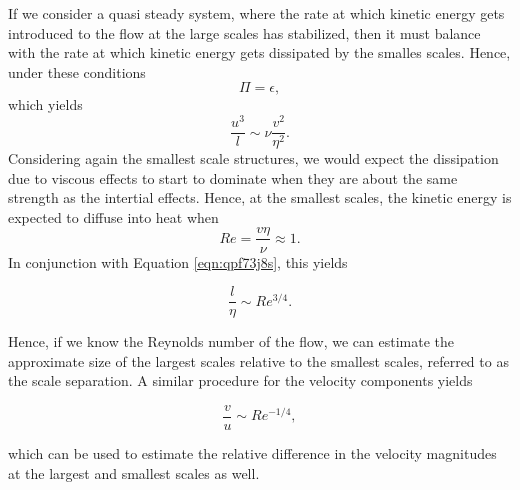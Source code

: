 If we consider a quasi steady system, where the rate at which kinetic energy gets introduced to the flow at the large scales has stabilized, then it must balance with the rate at which kinetic energy gets dissipated by the smalles scales. Hence, under these conditions
\begin{equation}
	\Pi = \epsilon,
\end{equation}
which yields
\begin{equation}
	\label{eqn:qpf73j8s}
	\frac{u^3}{l} \sim \nu \frac{v^2}{\eta^2}.
\end{equation}
Considering again the smallest scale structures, we would expect the dissipation due to viscous effects to start to dominate when they are about the same strength as the intertial effects. Hence, at the smallest scales, the kinetic energy is expected to diffuse into heat when
\begin{equation}
	Re = \frac{v \eta}{\nu} \approx 1.
\end{equation}
In conjunction with Equation \ref{eqn:qpf73j8s}, this yields
\begin{eqBox}
\begin{equation}
	\frac{l}{\eta} \sim Re^{3/4}.
\end{equation}
\end{eqBox}
Hence, if we know the Reynolds number of the flow, we can estimate the approximate size of the largest scales relative to the smallest scales, referred to as the scale separation. A similar procedure for the velocity components yields
\begin{eqBox}
\begin{equation}
	\frac{v}{u} \sim Re^{-1/4},
\end{equation}
\end{eqBox}
which can be used to estimate the relative difference in the velocity magnitudes at the largest and smallest scales as well.

